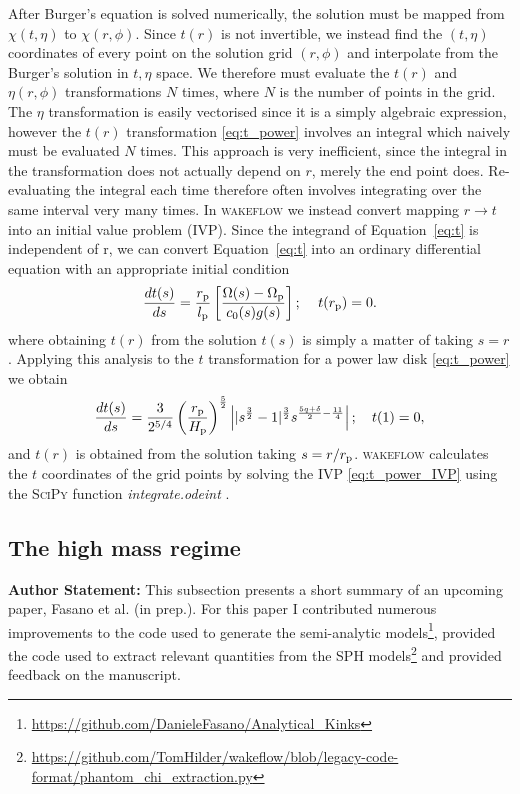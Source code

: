 After Burger's equation is solved numerically, the solution must be mapped from $\chi(t,\eta)$ to $\chi(r,\phi)$.
Since $t(r)$ is not invertible, we instead find the $(t,\eta)$ coordinates of every point on the solution grid $(r,\phi)$ and interpolate from the Burger's solution in $t,\eta$ space.
We therefore must evaluate the $t(r)$ and $\eta(r,\phi)$ transformations $N$ times, where $N$ is the number of points in the grid.
The $\eta$ transformation is easily vectorised since it is a simply algebraic expression, however the $t(r)$ transformation \eqref{eq:t_power} involves an integral which naively must be evaluated $N$ times.
This approach is very inefficient, since the integral in the transformation does not actually depend on $r$, merely the end point does.
Re-evaluating the integral each time therefore often involves integrating over the same interval very many times.
In \textsc{wakeflow} we instead convert mapping $r\rightarrow t$ into an initial value problem (IVP).
Since the integrand of Equation~\eqref{eq:t} is independent of r, we can convert Equation~\eqref{eq:t} into an ordinary differential equation with an appropriate initial condition
\begin{align}
    \frac{dt(s)}{ds} = \frac{r_{\rm p}}{l_{\rm p}} \left[ \frac{\Omega(s) - \Omega_{\rm p}}{c_0(s) g(s)} \right]; \quad \, t(r_{\rm p}) = 0.
\end{align}
where obtaining $t(r)$ from the solution $t(s)$ is simply a matter of taking $s=r$.
Applying this analysis to the $t$ transformation for a power law disk \eqref{eq:t_power} we obtain 
\begin{align}
    \frac{dt(s)}{ds} = \frac{3}{2^{5/4}} \left( \frac{r_{\rm p}}{H_{\rm p}} \right)^{\frac{5}{2}} \left| |s^\frac{3}{2} - 1|^\frac{3}{2} s^{\frac{5q+\delta}{2}-\frac{11}{4}} \right|; \quad t(1)=0, \label{eq:t_power_IVP}
\end{align}
and $t(r)$ is obtained from the solution taking $s=r/r_{\rm p}$.
\textsc{wakeflow} calculates the $t$ coordinates of the grid points by solving the IVP \eqref{eq:t_power_IVP} using the \textsc{SciPy} function \textit{integrate.odeint} \citep{virtanen2020}.

\subsection{The high mass regime} \label{sec:high_mass}

\textbf{Author Statement:} This subsection presents a short summary of an upcoming paper, Fasano et al. (in prep.). 
For this paper I contributed numerous improvements to the code used to generate the semi-analytic models\footnote{\url{https://github.com/DanieleFasano/Analytical_Kinks}}, provided the code used to extract relevant quantities from the SPH models\footnote{\url{https://github.com/TomHilder/wakeflow/blob/legacy-code-format/phantom_chi_extraction.py}} and provided feedback on the manuscript.

